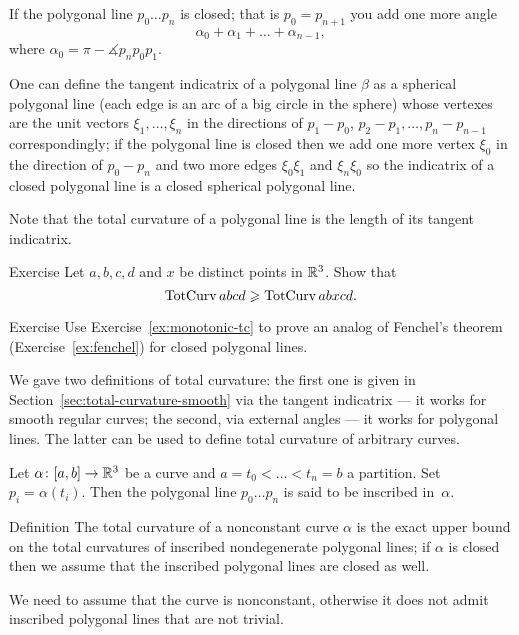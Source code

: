 If the polygonal line $p_0\dots p_n$ is closed; that is $p_0=p_{n+1}$ you add one more angle 
\[\alpha_0+\alpha_1+\dots+\alpha_{n-1},\]
where $\alpha_0=\pi-\measuredangle p_{n}p_0p_{1}$.

One can define the tangent indicatrix of a polygonal line $\beta$ as a spherical polygonal line (each edge is an arc of a big circle in the sphere) whose vertexes are the unit vectors $\xi_1,\dots,\xi_n$ in the directions of $p_1-p_0$, $p_2-p_1,\dots, p_n-p_{n-1}$ correspondingly;
if the  polygonal line is closed then we add one more vertex $\xi_0$ in the direction of $p_0-p_{n}$ and two more edges $\xi_0\xi_1$ and $\xi_n\xi_0$ so the indicatrix of a closed polygonal line is a closed spherical polygonal line.

Note that the total curvature of a polygonal line is the length of its tangent indicatrix.

\begin{thm}{Exercise}\label{ex:monotonic-tc}
Let $a,b,c,d$ and $x$ be distinct points in $\mathbb{R}^3$.
Show that 
\[\mathop{\rm TotCurv}\nolimits abcd\geqslant \mathop{\rm TotCurv}\nolimits abxcd.\]
\end{thm}

\begin{thm}{Exercise}\label{ex:poly-fenchel}
Use Exercise~\ref{ex:monotonic-tc} to prove an analog of Fenchel's theorem (Exercise~\ref{ex:fenchel}) for closed polygonal lines.
\end{thm}


We gave two definitions of total curvature:
the first one is given in Section~\ref{sec:total-curvature-smooth} via the tangent indicatrix --- it works for smooth regular curves;
the second, via external angles --- it works for polygonal lines.
The latter can be used to define total curvature of arbitrary curves.


Let  $\alpha\colon[a,b]\to \mathbb{R}^3$ be a curve and  $a=t_0<\dots<t_n=b$ a partition.
Set $p_i=\alpha(t_i)$.
Then the polygonal line $p_0\dots p_n$ is said to be inscribed in~$\alpha$. 

\begin{thm}{Definition}\label{def:total-curv-poly}
The total curvature of a nonconstant curve $\alpha$ is the exact upper bound on the total curvatures of inscribed nondegenerate polygonal lines;
if $\alpha$ is closed then we assume that the inscribed polygonal lines are closed as well.
\end{thm}

We need to assume that the curve is nonconstant, otherwise it does not admit inscribed polygonal lines that are not trivial.

